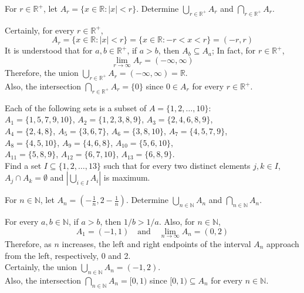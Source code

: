 \documentclass[12pt]{article}
\newcommand{\N}{\mathbb{N}}
\newcommand{\R}{\mathbb{R}}
\newenvironment{problem}[2][Problem]{\begin{trivlist}
		\item[\hskip \labelsep {\bfseries #1}\hskip \labelsep {\bfseries #2.}]}{\end{trivlist}}
\newenvironment{solution}[2][Solution]{\begin{trivlist}
		\item[\hskip \labelsep {\bfseries #1}\hskip \labelsep {\bfseries #2.}]}{\end{trivlist}}
\begin{document}
	\begin{problem}{43}
		For $r \in \R^{+}$, let $A_{r} = \{x \in \R: |x|<r\}$. Determine $\bigcup_{r\in \R^{+}}A_{r}$ and $\bigcap_{r\in \R^{+}}A_{r}$.
		\begin{solution}{}
			Certainly, for every $r \in \R^{+}$,
			\begin{equation*}
				A_{r} = \{x \in \R: |x|<r\} = \{x \in \R: -r<x<r\} = (-r,r)
			\end{equation*}
		It is understood that for $a,b \in \R^{+}$, if $a > b$, then $A_{b} \subseteq A_{a}$; In fact, for $r \in \R^{+}$,
		\begin{equation*}
			\lim_{r\to \infty} A_{r} = (-\infty,\infty)
		\end{equation*}
		Therefore, the union $\bigcup_{r\in \R^{+}} A_{r} = (-\infty,\infty) = \R$.\\
		Also, the intersection $\bigcap_{r\in \R^{+}} A_{r}= \{0\}$ since $0 \in A_{r}$ for every $r \in \R^{+}$.
		\end{solution}
	\end{problem}

	\begin{problem}{44}
		Each of the following sets is a subset of $A=\{1,2,\ldots,10\}$:\\
			$A_{1} = \{1,5,7,9,10\}$, $A_{2} = \{1,2,3,8,9\}$, $A_{3} = \{2,4,6,8,9\}$,\\
			$A_{4} = \{2,4,8\}$, $A_{5} =\{3,6,7\}$, $A_{6} = \{3,8,10\}$, $A_{7} = \{4,5,7,9\}$,\\
			$A_{8} = \{4,5,10\}$, $A_{9} = \{4,6,8\}$, $A_{10} = \{5,6,10\}$,\\
			$A_{11}=\{5,8,9\}$, $A_{12} = \{6,7,10\}$, $A_{13}=\{6,8,9\}$.\\
		Find a set $I \subseteq \{1,2,\ldots,13\}$ such that for every two distinct elements $j,k \in I$, $A_{j}\cap A_{k} = \emptyset$ and $|\bigcup_{i\in I}A_{i}|$ is maximum. 
	\end{problem}
 
	\begin{problem}{45}
		For $n \in \N$, let $A_{n} = \left(-\frac{1}{n}, 2-\frac{1}{n}\right)$. Determine $\bigcup_{n\in \N}A_{n}$ and $\bigcap_{n\in \N}A_{n}$.
		\begin{solution}{}
			For every $a,b \in \N$, if $a>b$, then $1/b > 1/a$. Also, for $n \in \N$,  
			\begin{equation*}
				A_{1} = (-1,1) \quad \text{and} \quad \lim_{n\to \infty}A_{n} = (0,2)
			\end{equation*} 
		Therefore, as $n$ increases, the left and right endpoints of the interval $A_{n}$ approach from the left, respectively, 0 and 2.\\
		Certainly, the union $\bigcup_{n \in \N}A_{n} = (-1,2)$.\\
		Also, the intersection $\bigcap_{n \in \N}A_{n} = [0,1)$ since $[0,1) \subseteq A_{n}$ for every $n \in \N$.
		\end{solution}
	\end{problem}
\end{document}
